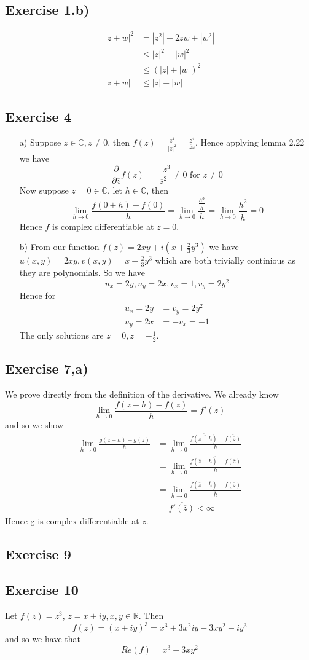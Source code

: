 \documentclass[a4paper, 12pt, twoside]{article}
\author{jdRanda}
\begin{document}
\subsection*{Exercise 1.b)}
\begin{align*}
    |z+w|^{2} &= |z^{2}|+2zw+|w^{2}|\\
    &\leq |z|^{2}+|w|^{2}\\
    &\leq (|z|+|w|)^{2}\\
    |z+w| &\leq|z|+|w|
\end{align*}
\subsection*{Exercise 4}
\begin{itemize}
    \item[a)]
    Suppose $z\in \mathbb{C}, z\neq0$, then $f(z)=\frac{z^{4}}{|z|^{2}}= \frac{z^{4}}{\overline{z}z}$. Hence applying lemma 2.22 we have
    $$\frac{\partial}{\partial\overline{z}}f(z)=\frac{-z^{3}}{\overline{z}^{2}}\neq 0\text{   for } z \neq 0$$
    Now suppose $z=0\in \mathbb{C}$, let $h\in \mathbb{C}$, then
    $$ \lim_{h\to0}\frac{f(0+h)-f(0)}{h}=\lim_{h\to0}\frac{\frac{h^{3}}{\overline{h}}}{h}= \lim_{h\to0}\frac{h^{2}}{\overline{h}}=0 $$
    Hence $f$ is complex differentiable at $z=0$.
    \item[b)]
    From our function $f(z)=2xy+i(x+\frac{2}{3}y^{3})$ we have $u(x,y)=2xy,v(x,y)= x+\frac{2}{3}y^{3}$ which are both trivially continious as they are polynomials. So we have
    $$u_{x}=2y,u_{y}=2x,v_{x}=1,v_y=2y^{2} $$
    Hence for
    \begin{align*}
        u_{x}=2y &= v_y=2y^{2}\\
        u_{y}=2x &= -v_{x}=-1
    \end{align*}
    The only solutions are $z=0,z=-\frac{1}{2}$.
\end{itemize}

\newpage
\subsection*{Exercise 7,a)}
We prove directly from the definition of the derivative. We already know
$$ \lim_{h\to0}\frac{f(z+h)-f(z)}{h}=f'(z)$$
and so we show
\begin{align*}
    \lim_{h\to0}\frac{g(z+h)-g(z)}{h} &=
    \lim_{h\to0}\frac{\overline{f(\overline{z+h})}-\overline{f(\overline{z})}}{h}\\
    &= \lim_{h\to0}\frac{\overline{f(\overline{z}+\overline{h})-{f(\overline{z})}}}{h}\\
    &=\overline{\lim_{h\to0}\frac{f(\overline{z}+\overline{h})-{f(\overline{z})}}{\overline{h}}}\\
    &=\overline{f'(\overline{z})}<\infty
\end{align*}
Hence g is complex differentiable at $z$.


\subsection*{Exercise 9}



\subsection*{Exercise 10}
Let $f(z)=z^{3}$, $z=x+iy, x,y\in \mathbb{R}$. Then
$$ f(z)=(x+iy)^{3}=x^{3}+3x^{2}iy-3xy^{2}-iy^{3}$$
and so we have that
$$Re(f)= x^{3}-3xy^{2}$$
\end{document}
